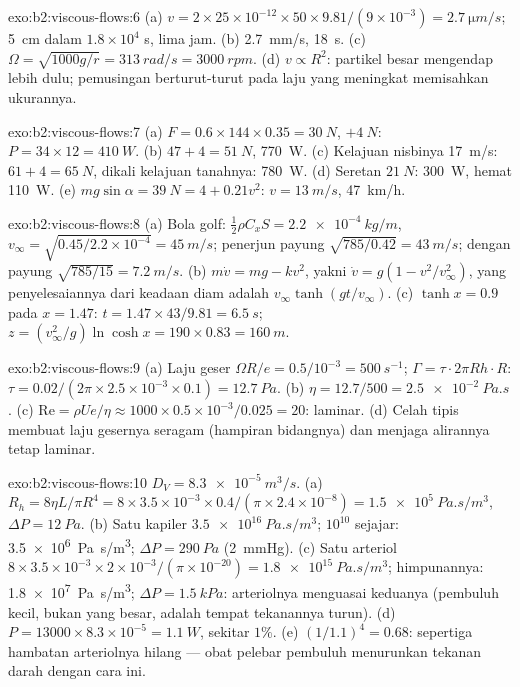 \begin{solution}{exo:b2:viscous-flows:6}
(a) $v = 2 \times 25 \times 10^{-12} \times 50 \times 9.81/(9 \times 10^{-3}) = \qty{2.7}{\micro m/s}$;
\qty{5}{cm} dalam $1.8 \times 10^4$ s, lima jam. (b) \qty{2.7}{mm/s}, \qty{18}{s}. (c)
$\Omega = \sqrt{1000g/r} = \qty{313}{rad/s} = \qty{3000}{rpm}$. (d) $v \propto R^2$: partikel
besar mengendap lebih dulu; pemusingan berturut-turut pada laju yang meningkat memisahkan
ukurannya.
\end{solution}

\begin{solution}{exo:b2:viscous-flows:7}
(a) $F = 0.6 \times 144 \times 0.35 = \qty{30}{N}$, $+\qty{4}{N}$: $P = 34 \times 12 =
\qty{410}{W}$. (b) $47 + 4 = \qty{51}{N}$, \qty{770}{W}. (c) Kelajuan nisbinya
\qty{17}{m/s}: $61 + 4 = \qty{65}{N}$, dikali kelajuan tanahnya: \qty{780}{W}. (d)
Seretan $\qty{21}{N}$: \qty{300}{W}, hemat \qty{110}{W}. (e) $mg\sin\alpha = \qty{39}{N} =
4 + 0.21v^2$: $v = \qty{13}{m/s}$, \qty{47}{km/h}.
\end{solution}

\begin{solution}{exo:b2:viscous-flows:8}
(a) Bola golf: $\tfrac12\rho C_xS = \qty{2.2e-4}{kg/m}$, $v_\infty = \sqrt{0.45/2.2 \times 10^{-4}}
= \qty{45}{m/s}$; penerjun payung $\sqrt{785/0.42} = \qty{43}{m/s}$; dengan payung $\sqrt{785/15} =
\qty{7.2}{m/s}$. (b) $m\dot v = mg - kv^2$, yakni $\dot v = g(1 - v^2/v_\infty^2)$,
yang penyelesaiannya dari keadaan diam adalah $v_\infty\tanh(gt/v_\infty)$. (c) $\tanh x = 0.9$ pada
$x = 1.47$: $t = 1.47 \times 43/9.81 = \qty{6.5}{s}$; $z = (v_\infty^2/g)\ln\cosh x =
190 \times 0.83 = \qty{160}{m}$.
\end{solution}

\begin{solution}{exo:b2:viscous-flows:9}
(a) Laju geser $\Omega R/e = 0.5/10^{-3} = \qty{500}{s^{-1}}$; $\Gamma = \tau\cdot2\pi Rh
\cdot R$: $\tau = 0.02/(2\pi \times 2.5 \times 10^{-3} \times 0.1) = \qty{12.7}{Pa}$. (b) $\eta
= 12.7/500 = \qty{2.5e-2}{Pa.s}$. (c) $\mathrm{Re} = \rho Ue/\eta \approx 1000 \times 0.5 \times
10^{-3}/0.025 = 20$: laminar. (d) Celah tipis membuat laju gesernya seragam
(hampiran bidangnya) dan menjaga alirannya tetap laminar.
\end{solution}

\begin{solution}{exo:b2:viscous-flows:10}
$D_V = \qty{8.3e-5}{m^3/s}$. (a) $R_h = 8\eta L/\pi R^4 = 8 \times 3.5 \times 10^{-3} \times
0.4/(\pi \times 2.4 \times 10^{-8}) = \qty{1.5e5}{Pa.s/m^3}$, $\Delta P = \qty{12}{Pa}$. (b)
Satu kapiler $\qty{3.5e16}{Pa.s/m^3}$; $10^{10}$ sejajar: \qty{3.5e6}{Pa.s/m^3};
$\Delta P = \qty{290}{Pa}$ (\qty{2}{mmHg}). (c) Satu arteriol $8 \times 3.5 \times 10^{-3}
\times 2 \times 10^{-3}/(\pi \times 10^{-20}) = \qty{1.8e15}{Pa.s/m^3}$; himpunannya:
\qty{1.8e7}{Pa.s/m^3}; $\Delta P = \qty{1.5}{kPa}$: arteriolnya menguasai
keduanya (pembuluh kecil, bukan yang besar, adalah tempat tekanannya
turun). (d) $P = 13000 \times 8.3 \times 10^{-5} = \qty{1.1}{W}$, sekitar $1\%$. (e)
$(1/1.1)^4 = 0.68$: sepertiga hambatan arteriolnya hilang ---
obat pelebar pembuluh menurunkan tekanan darah dengan cara ini.
\end{solution}

